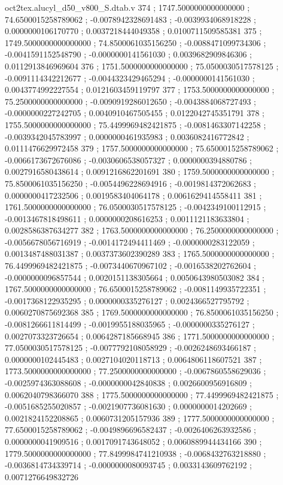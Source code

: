 \begin{filecontents}[overwrite]{oct2tex.alucyl_d50_v800_S.dtab.v}
374 ; 1747.5000000000000000 ; 74.6500015258789062 ; -0.0078942328691483 ; -0.0039934068918228 ; 0.0000000106170770 ; 0.0037218444049358 ; 0.0100711509585381
375 ; 1749.5000000000000000 ; 74.8500061035156250 ; -0.0088471099734306 ; -0.0041591152548790 ; -0.0000000141561030 ; 0.0039682909846306 ; 0.0112913846969604
376 ; 1751.5000000000000000 ; 75.0500030517578125 ; -0.0091114342212677 ; -0.0044323429465294 ; -0.0000000141561030 ; 0.0043774992227554 ; 0.0121603459119797
377 ; 1753.5000000000000000 ; 75.2500000000000000 ; -0.0090919286012650 ; -0.0043884068727493 ; -0.0000000227242705 ; 0.0040910467505455 ; 0.0122042745351791
378 ; 1755.5000000000000000 ; 75.4499969482421875 ; -0.0081463307142258 ; -0.0039342045783997 ; 0.0000000461935983 ; 0.0036082416772842 ; 0.0111476629972458
379 ; 1757.5000000000000000 ; 75.6500015258789062 ; -0.0066173672676086 ; -0.0030606538057327 ; 0.0000000394880786 ; 0.0027916580438614 ; 0.0091216862201691
380 ; 1759.5000000000000000 ; 75.8500061035156250 ; -0.0054496228694916 ; -0.0019814372062683 ; 0.0000000417232506 ; 0.0019583404064178 ; 0.0061629414558411
381 ; 1761.5000000000000000 ; 76.0500030517578125 ; -0.0042349100112915 ; -0.0013467818498611 ; 0.0000000208616253 ; 0.0011121183633804 ; 0.0028586387634277
382 ; 1763.5000000000000000 ; 76.2500000000000000 ; -0.0056678056716919 ; -0.0014172494411469 ; -0.0000000283122059 ; 0.0013487488031387 ; 0.0037373602390289
383 ; 1765.5000000000000000 ; 76.4499969482421875 ; -0.0073440670967102 ; -0.0016538202762604 ; -0.0000000096857544 ; 0.0020151138305664 ; 0.0050643980503082
384 ; 1767.5000000000000000 ; 76.6500015258789062 ; -0.0081149935722351 ; -0.0017368122935295 ; 0.0000000335276127 ; 0.0024366527795792 ; 0.0060270875692368
385 ; 1769.5000000000000000 ; 76.8500061035156250 ; -0.0081266611814499 ; -0.0019955188035965 ; -0.0000000335276127 ; 0.0027073323726654 ; 0.0064287185668945
386 ; 1771.5000000000000000 ; 77.0500030517578125 ; -0.0077792108058929 ; -0.0026248693466187 ; 0.0000000102445483 ; 0.0027104020118713 ; 0.0064806118607521
387 ; 1773.5000000000000000 ; 77.2500000000000000 ; -0.0067860558629036 ; -0.0025974363088608 ; -0.0000000042840838 ; 0.0026600956916809 ; 0.0062040798366070
388 ; 1775.5000000000000000 ; 77.4499969482421875 ; -0.0051685255020857 ; -0.0021907736081630 ; 0.0000000014202669 ; 0.0021824152208865 ; 0.0060731205157936
389 ; 1777.5000000000000000 ; 77.6500015258789062 ; -0.0049896696582437 ; -0.0026406263932586 ; 0.0000000041909516 ; 0.0017091743648052 ; 0.0060889944434166
390 ; 1779.5000000000000000 ; 77.8499984741210938 ; -0.0068432763218880 ; -0.0036814734339714 ; -0.0000000080093745 ; 0.0033143609762192 ; 0.0071276649832726

\end{filecontents}

